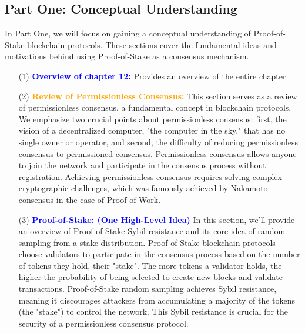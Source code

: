 \subsection{Part One: Conceptual Understanding}

In Part One, we will focus on gaining a conceptual understanding of Proof-of-Stake blockchain protocols. These sections cover the fundamental ideas and motivations behind using Proof-of-Stake as a consensus mechanism.

\begin{enumerate}[label=(\arabic*)]
  \item[(1)] \textcolor{blue}{\textbf{Overview of chapter 12:}} Provides an overview of the entire chapter.
  \item[(2)] \textcolor{orange}{\textbf{Review of Permissionless Consensus:}} This section serves as a review of permissionless consensus, a fundamental concept in blockchain protocols. We emphasize two crucial points about permissionless consensus: first, the vision of a decentralized computer, "the computer in the sky," that has no single owner or operator, and second, the difficulty of reducing permissionless consensus to permissioned consensus. Permissionless consensus allows anyone to join the network and participate in the consensus process without registration. Achieving permissionless consensus requires solving complex cryptographic challenges, which was famously achieved by Nakamoto consensus in the case of Proof-of-Work. 

  \item[(3)] \textcolor{blue}{\textbf{Proof-of-Stake: (One High-Level Idea)}} In this section, we'll provide an overview of Proof-of-Stake Sybil resistance and its core idea of random sampling from a stake distribution. Proof-of-Stake blockchain protocols choose validators to participate in the consensus process based on the number of tokens they hold, their "stake". The more tokens a validator holds, the higher the probability of being selected to create new blocks and validate transactions. Proof-of-Stake random sampling achieves Sybil resistance, meaning it discourages attackers from accumulating a majority of the tokens (the "stake") to control the network. This Sybil resistance is crucial for the security of a permissionless consensus protocol. 


\end{enumerate}
